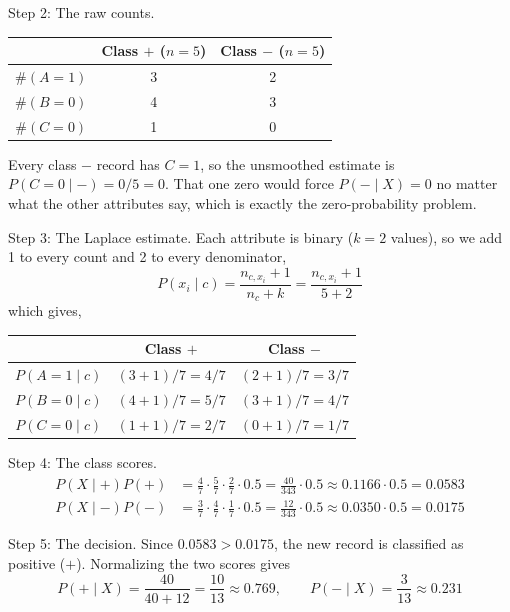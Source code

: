 \documentclass[12pt,letterpaper, onecolumn]{exam}
\begin{document}
\begin{questions}
\begin{solution}
        Step 2: The raw counts.
        \begin{center}
            \begin{tabular}{|c|c|c|}
                \hline & Class $+$ ($n=5$) & Class $-$ ($n=5$) \\ \hline
                $\#(A=1)$ & 3 & 2 \\
                $\#(B=0)$ & 4 & 3 \\
                $\#(C=0)$ & 1 & 0 \\ \hline
            \end{tabular}
        \end{center}
        Every class $-$ record has $C=1$, so the unsmoothed estimate is $P(C=0\mid -) = 0/5 = 0$. That one zero would force $P(-\mid X)=0$ no matter what the other attributes say, which is exactly the zero-probability problem.

        Step 3: The Laplace estimate. Each attribute is binary ($k=2$ values), so we add 1 to every count and 2 to every denominator,
        \begin{equation*}
            P(x_i\mid c) = \frac{n_{c,x_i}+1}{n_c+k} = \frac{n_{c,x_i}+1}{5+2}
        \end{equation*}
        which gives,
        \begin{center}
            \begin{tabular}{|c|c|c|}
                \hline & Class $+$ & Class $-$ \\ \hline
                $P(A=1\mid c)$ & $(3+1)/7 = 4/7$ & $(2+1)/7 = 3/7$ \\
                $P(B=0\mid c)$ & $(4+1)/7 = 5/7$ & $(3+1)/7 = 4/7$ \\
                $P(C=0\mid c)$ & $(1+1)/7 = 2/7$ & $(0+1)/7 = 1/7$ \\ \hline
            \end{tabular}
        \end{center}

        Step 4: The class scores.
        \begin{align*}
            P(X\mid +)P(+) &= \tfrac{4}{7}\cdot\tfrac{5}{7}\cdot\tfrac{2}{7}\cdot 0.5 = \tfrac{40}{343}\cdot 0.5 \approx 0.1166\cdot 0.5 = 0.0583\\
            P(X\mid -)P(-) &= \tfrac{3}{7}\cdot\tfrac{4}{7}\cdot\tfrac{1}{7}\cdot 0.5 = \tfrac{12}{343}\cdot 0.5 \approx 0.0350\cdot 0.5 = 0.0175
        \end{align*}

        Step 5: The decision. Since $0.0583 > 0.0175$, the new record is classified as positive ($+$). Normalizing the two scores gives
        \begin{equation*}
            P(+\mid X) = \frac{40}{40+12} = \frac{10}{13} \approx 0.769, \qquad P(-\mid X) = \frac{3}{13}\approx 0.231
        \end{equation*}


\end{solution}
\end{questions}
\end{document}

